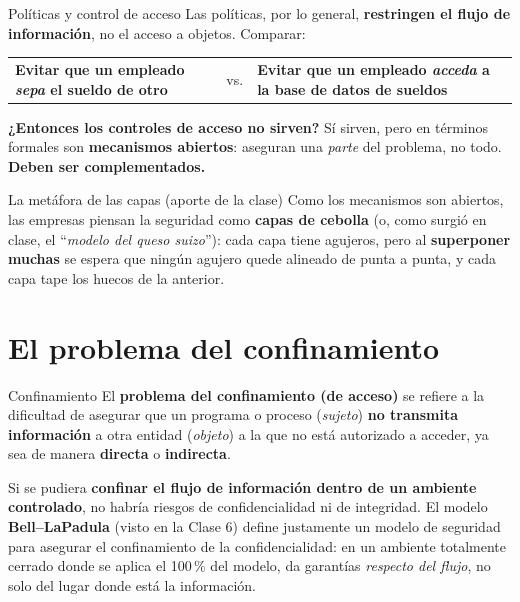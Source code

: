 \documentclass[11pt,a4paper]{article}
\begin{document}
\begin{defbox}{Políticas y control de acceso}
Las políticas, por lo general, \textbf{restringen el flujo de información}, no el acceso a
objetos. Comparar:
\begin{center}
\begin{tabular}{p{6.2cm} c p{6.2cm}}
\textbf{Evitar que un empleado \emph{sepa} el sueldo de otro} & vs. &
\textbf{Evitar que un empleado \emph{acceda} a la base de datos de sueldos}\\
\end{tabular}
\end{center}
\textbf{¿Entonces los controles de acceso no sirven?} Sí sirven, pero en términos formales son
\textbf{mecanismos abiertos}: aseguran una \emph{parte} del problema, no todo. \textbf{Deben
ser complementados.}
\end{defbox}

\begin{practbox}{La metáfora de las capas (aporte de la clase)}
Como los mecanismos son abiertos, las empresas piensan la seguridad como \textbf{capas de
cebolla} (o, como surgió en clase, el ``\emph{modelo del queso suizo}''): cada capa tiene
agujeros, pero al \textbf{superponer muchas} se espera que ningún agujero quede alineado de
punta a punta, y cada capa tape los huecos de la anterior.
\end{practbox}

\section{El problema del confinamiento}

\begin{defbox}{Confinamiento}
El \textbf{problema del confinamiento (de acceso)} se refiere a la dificultad de asegurar que
un programa o proceso (\emph{sujeto}) \textbf{no transmita información} a otra entidad
(\emph{objeto}) a la que no está autorizado a acceder, ya sea de manera \textbf{directa} o
\textbf{indirecta}.
\end{defbox}

Si se pudiera \textbf{confinar el flujo de información dentro de un ambiente controlado}, no
habría riesgos de confidencialidad ni de integridad. El modelo \textbf{Bell--LaPadula} (visto
en la Clase 6) define justamente un modelo de seguridad para asegurar el confinamiento de la
confidencialidad: en un ambiente totalmente cerrado donde se aplica el 100\,\% del modelo, da
garantías \emph{respecto del flujo}, no solo del lugar donde está la información.
\end{document}
